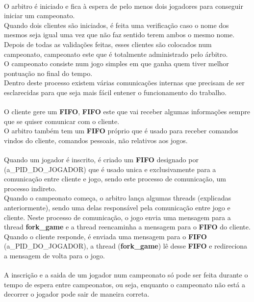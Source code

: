 \documentclass[letterpaper, 11pt]{article}
\begin{document}
\paragraph{}
O arbitro é iniciado e fica à espera de pelo menos dois jogadores para conseguir iniciar um campeonato.\\
Quando dois clientes são iniciados, é feita uma verificação caso o nome dos mesmos seja igual uma vez que não faz sentido terem ambos o mesmo nome.\\
Depois de todas as validações feitas, esses clientes são colocados num campeonato, campeonato este que é totalmente administrado pelo árbitro.\\
O campeonato consiste num jogo simples em que ganha quem tiver melhor pontuação no final do tempo.\\
Dentro deste processo existem várias comunicações internas que precisam de ser esclarecidas para que seja mais fácil entener o funcionamento do trabalho.
\paragraph{}
O cliente gere um \textbf{FIFO}, \textbf{FIFO} este que vai receber algumas informações sempre que se quiser comunicar com o cliente.\\
O arbitro também tem um \textbf{FIFO} próprio que é usado para receber comandos vindos do cliente, comandos pessoais, não relativos aos jogos.
\paragraph{}
Quando um jogador é inscrito, é criado um \textbf{FIFO} designado por (a\_PID\_DO\_JOGADOR) que é usado unica e exclusivamente para a comunicação entre cliente e jogo, sendo este processo de comunicação, um processo indireto.\\
Quando o campeonato começa, o arbitro lança algumas threads (explicadas anteriormente), sendo uma delas responsável pela comunicação entre jogo e cliente. Neste processo de comunicação, o jogo envia uma mensagem para a thread \textbf{fork\_game} e a thread reencaminha a mensagem para o \textbf{FIFO} do cliente. Quando o cliente responde, é enviada uma mensagem para o \textbf{FIFO} (a\_PID\_DO\_JOGADOR), a thread (\textbf{fork\_game}) lê desse \textbf{FIFO} e redireciona a mensagem de volta para o jogo.
\paragraph{}
A inscrição e a saida de um jogador num campeonato só pode ser feita durante o tempo de espera entre campeonatos, ou seja, enquanto o campeonato não está a decorrer o jogador pode sair de maneira correta.
\end{document}
